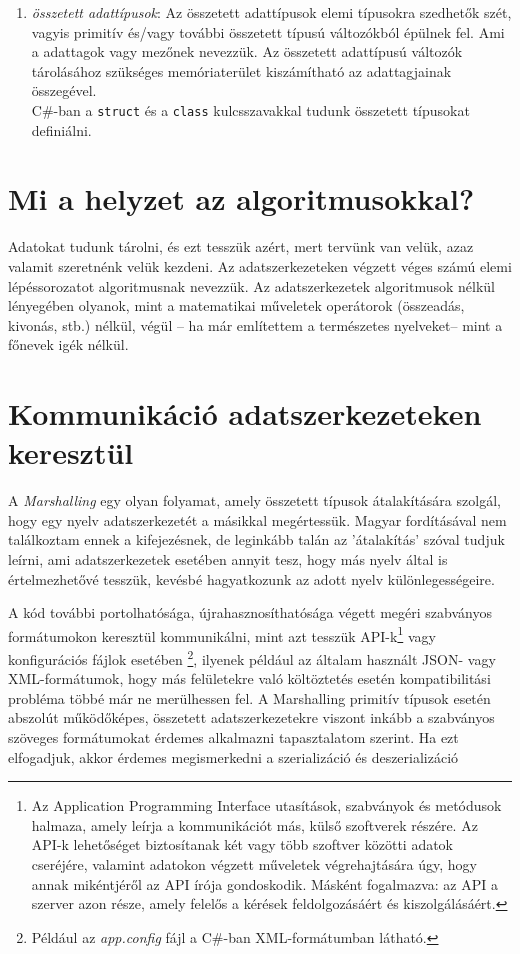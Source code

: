 \documentclass[tocnopagenum]{thesis-ekf}
\theoremstyle{definition}
\theoremstyle{remark}
\begin{document}
\begin{enumerate}[label=\alph*)]
\begin{enumerate}
\begin{tabular}{cc}
				\end{tabular}
			\end{enumerate}
	\item \emph{összetett adattípusok}: Az összetett adattípusok elemi típusokra szedhetők szét, vagyis primitív és/vagy további összetett típusú változókból épülnek fel. Ami a adattagok vagy mezőnek nevezzük. Az összetett adattípusú változók tárolásához szükséges memóriaterület kiszámítható az adattagjainak összegével.\\
	C\#-ban a \verb*|struct| és a \verb*|class| kulcsszavakkal tudunk összetett típusokat definiálni.
	\end{enumerate}
	\section{Mi a helyzet az algoritmusokkal?}
	Adatokat tudunk tárolni, és ezt tesszük azért, mert tervünk van velük, azaz valamit szeretnénk velük kezdeni. Az adatszerkezeteken végzett véges számú elemi lépéssorozatot algoritmusnak nevezzük. Az adatszerkezetek algoritmusok nélkül lényegében olyanok, mint a matematikai műveletek operátorok (összeadás, kivonás, stb.) nélkül, végül -- ha már említettem a természetes nyelveket-- mint a főnevek igék nélkül.
	\section{Kommunikáció adatszerkezeteken keresztül}
	A \emph{Marshalling} egy olyan folyamat, amely összetett típusok átalakítására szolgál, hogy egy nyelv adatszerkezetét a másikkal megértessük. Magyar fordításával nem találkoztam ennek a kifejezésnek, de leginkább talán az 'átalakítás' szóval tudjuk leírni, ami adatszerkezetek esetében annyit tesz, hogy más nyelv által is értelmezhetővé tesszük, kevésbé hagyatkozunk az adott nyelv különlegességeire.
	\par
	A kód további portolhatósága, újrahasznosíthatósága végett megéri szabványos formátumokon keresztül kommunikálni, mint azt tesszük API-k\footnote{Az Application Programming Interface utasítások, szabványok és metódusok halmaza, amely leírja a kommunikációt más, külső szoftverek részére. Az API-k lehetőséget biztosítanak két vagy több szoftver közötti adatok cseréjére, valamint adatokon végzett műveletek végrehajtására úgy, hogy annak mikéntjéről az API írója gondoskodik. Másként fogalmazva: az API a szerver azon része, amely felelős a kérések feldolgozásáért és kiszolgálásáért.} vagy konfigurációs fájlok esetében \footnote{Például az \textit{app.config} fájl a C\#-ban XML-formátumban látható.}, ilyenek például az általam használt JSON- vagy XML-formátumok,  hogy más felületekre való költöztetés esetén kompatibilitási probléma többé már ne merülhessen fel.
	A Marshalling primitív típusok esetén abszolút működőképes, összetett adatszerkezetekre viszont inkább a szabványos szöveges formátumokat érdemes alkalmazni tapasztalatom szerint. Ha ezt elfogadjuk, akkor érdemes megismerkedni a szerializáció és deszerializáció %
\end{document}
